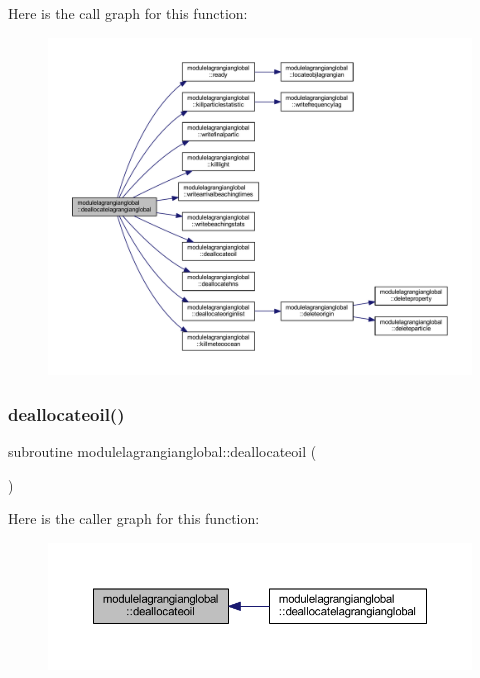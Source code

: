 Here is the call graph for this function\+:\nopagebreak
\begin{figure}[H]
\begin{center}
\leavevmode
\includegraphics[width=350pt]{namespacemodulelagrangianglobal_ad5b47824d7c52644996eed764c9ee9ae_cgraph}
\end{center}
\end{figure}
\mbox{\label{namespacemodulelagrangianglobal_a09f60316f814ba83ce713d83c0cf67ef}} 
\subsubsection{\texorpdfstring{deallocateoil()}{deallocateoil()}}
{\footnotesize\ttfamily subroutine modulelagrangianglobal\+::deallocateoil (\begin{DoxyParamCaption}{ }\end{DoxyParamCaption})\hspace{0.3cm}{\ttfamily [private]}}

Here is the caller graph for this function\+:\nopagebreak
\begin{figure}[H]
\begin{center}
\leavevmode
\includegraphics[width=350pt]{namespacemodulelagrangianglobal_a09f60316f814ba83ce713d83c0cf67ef_icgraph}
\end{center}
\end{figure}
\mbox{\label{namespacemodulelagrangianglobal_a6e34918fa64284d7048a43df89293088}} 
